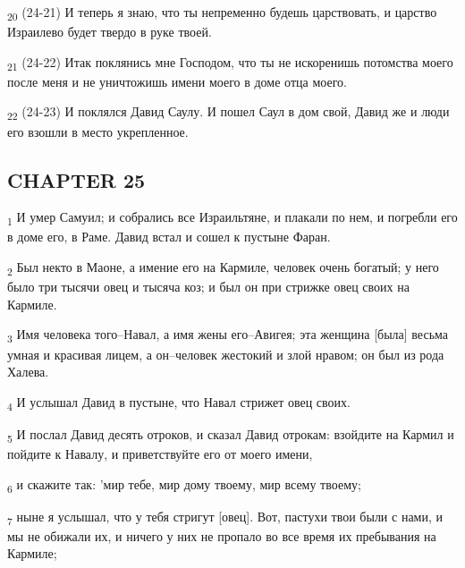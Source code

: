 \begin{tcolorbox}
\textsubscript{20} (24-21) И теперь я знаю, что ты непременно будешь царствовать, и царство Израилево будет твердо в руке твоей.
\end{tcolorbox}
\begin{tcolorbox}
\textsubscript{21} (24-22) Итак поклянись мне Господом, что ты не искоренишь потомства моего после меня и не уничтожишь имени моего в доме отца моего.
\end{tcolorbox}
\begin{tcolorbox}
\textsubscript{22} (24-23) И поклялся Давид Саулу. И пошел Саул в дом свой, Давид же и люди его взошли в место укрепленное.
\end{tcolorbox}
\subsection{CHAPTER 25}
\begin{tcolorbox}
\textsubscript{1} И умер Самуил; и собрались все Израильтяне, и плакали по нем, и погребли его в доме его, в Раме. Давид встал и сошел к пустыне Фаран.
\end{tcolorbox}
\begin{tcolorbox}
\textsubscript{2} Был некто в Маоне, а имение его на Кармиле, человек очень богатый; у него было три тысячи овец и тысяча коз; и был он при стрижке овец своих на Кармиле.
\end{tcolorbox}
\begin{tcolorbox}
\textsubscript{3} Имя человека того--Навал, а имя жены его--Авигея; эта женщина [была] весьма умная и красивая лицем, а он--человек жестокий и злой нравом; он был из рода Халева.
\end{tcolorbox}
\begin{tcolorbox}
\textsubscript{4} И услышал Давид в пустыне, что Навал стрижет овец своих.
\end{tcolorbox}
\begin{tcolorbox}
\textsubscript{5} И послал Давид десять отроков, и сказал Давид отрокам: взойдите на Кармил и пойдите к Навалу, и приветствуйте его от моего имени,
\end{tcolorbox}
\begin{tcolorbox}
\textsubscript{6} и скажите так: 'мир тебе, мир дому твоему, мир всему твоему;
\end{tcolorbox}
\begin{tcolorbox}
\textsubscript{7} ныне я услышал, что у тебя стригут [овец]. Вот, пастухи твои были с нами, и мы не обижали их, и ничего у них не пропало во все время их пребывания на Кармиле;
\end{tcolorbox}
